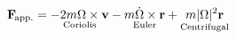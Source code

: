 \documentclass[preview]{standalone}
\begin{document}
\begin{align*}
\textbf{F}_\text{\!app.}=\underset{\text{Coriolis}}{-2m\Omega\times\textbf{v}}-\underset{\text{Euler}}{m\dot{\Omega}\times\textbf{r}}+\underset{\text{Centrifugal}}{m|\Omega|^2\textbf{r}}
\end{align*}
\end{document}
